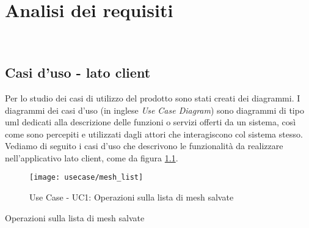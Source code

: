 
\chapter{Analisi dei requisiti}
\label{cap:analisi-requisiti}

\intro{}\\

\section{Casi d'uso - lato client}

Per lo studio dei casi di utilizzo del prodotto sono stati creati dei diagrammi.
I diagrammi dei casi d'uso (in inglese \emph{Use Case Diagram}) sono diagrammi di tipo \gls{uml} dedicati alla descrizione delle funzioni o servizi offerti da un sistema, così come sono percepiti e utilizzati dagli attori che interagiscono col sistema stesso.
Vediamo di seguito i casi d'uso che descrivono le funzionalità da realizzare nell'applicativo lato client, come da figura \ref{fig:mesh-list}.
\begin{figure}[!h] 
    \centering 
    \texttt{[image: usecase/mesh\_list]} 
    \caption{Use Case - UC1: Operazioni sulla lista di mesh salvate}
    \label{fig:mesh-list}
\end{figure}

\begin{usecase}{1}{Operazioni sulla lista di mesh salvate}
\\ 
\\ 
\\ 
\label{uc:lista-mesh}
\end{usecase}

